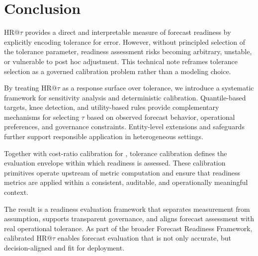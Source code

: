\section{Conclusion}
\label{sec:conclusion}

HR@$\tau$ provides a direct and interpretable measure of forecast readiness by
explicitly encoding tolerance for error.
However, without principled selection of the tolerance parameter, readiness
assessment risks becoming arbitrary, unstable, or vulnerable to post hoc
adjustment.
This technical note reframes tolerance selection as a governed calibration
problem rather than a modeling choice.

By treating HR@$\tau$ as a response surface over tolerance, we introduce a
systematic framework for sensitivity analysis and deterministic calibration.
Quantile-based targets, knee detection, and utility-based rules provide
complementary mechanisms for selecting $\tau$ based on observed forecast
behavior, operational preferences, and governance constraints.
Entity-level extensions and safeguards further support responsible application
in heterogeneous settings.

Together with cost-ratio calibration for \CWSL{}, tolerance calibration defines
the evaluation envelope within which readiness is assessed.
These calibration primitives operate upstream of metric computation and ensure
that readiness metrics are applied within a consistent, auditable, and
operationally meaningful context.

The result is a readiness evaluation framework that separates measurement from
assumption, supports transparent governance, and aligns forecast assessment with
real operational tolerance.
As part of the broader Forecast Readiness Framework, calibrated HR@$\tau$ enables
forecast evaluation that is not only accurate, but decision-aligned and fit for
deployment.
